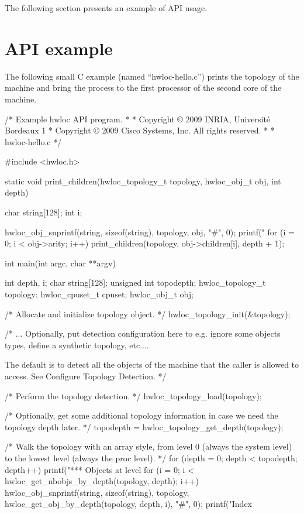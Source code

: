 The following section presents an example of API usage.\hypertarget{index_interface_example}{}\section{API example}\label{index_interface_example}
The following small C example (named ``hwloc-\/hello.c'') prints the topology of the machine and bring the process to the first processor of the second core of the machine.


\begin{DoxyCodeInclude}
/* Example hwloc API program.
 *
 * Copyright © 2009 INRIA, Université Bordeaux 1
 * Copyright © 2009 Cisco Systems, Inc.  All rights reserved.
 *
 * hwloc-hello.c 
 */

#include <hwloc.h>

static void print_children(hwloc_topology_t topology, hwloc_obj_t obj, 
                           int depth)
{
    char string[128];
    int i;

    hwloc_obj_snprintf(string, sizeof(string), topology, obj, "#", 0);
    printf("%
    for (i = 0; i < obj->arity; i++) {
        print_children(topology, obj->children[i], depth + 1);
    }
}

int main(int argc, char **argv)
{
    int depth, i;
    char string[128];
    unsigned int topodepth;
    hwloc_topology_t topology;
    hwloc_cpuset_t cpuset;
    hwloc_obj_t obj;

    /* Allocate and initialize topology object. */
    hwloc_topology_init(&topology);

    /* ... Optionally, put detection configuration here to e.g. ignore
       some objects types, define a synthetic topology, etc....  

       The default is to detect all the objects of the machine that
       the caller is allowed to access.  See Configure Topology
       Detection. */

    /* Perform the topology detection. */
    hwloc_topology_load(topology);

    /* Optionally, get some additional topology information
       in case we need the topology depth later. */
    topodepth = hwloc_topology_get_depth(topology);

    /* Walk the topology with an array style, from level 0 (always the
       system level) to the lowest level (always the proc level). */
    for (depth = 0; depth < topodepth; depth++) {
        printf("*** Objects at level %
        for (i = 0; i < hwloc_get_nbobjs_by_depth(topology, depth); 
             i++) {
            hwloc_obj_snprintf(string, sizeof(string), topology,
                       hwloc_get_obj_by_depth(topology, depth, i),
                       "#", 0);
            printf("Index %
        }
    }

}
\end{DoxyCodeInclude}
